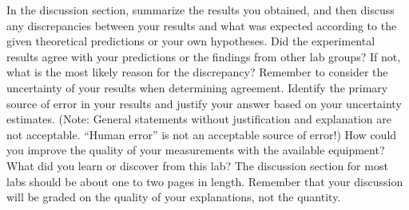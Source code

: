 \documentclass[12pt, letterpaper]{article}
\begin{document}
In the discussion section, summarize the results you obtained, and then discuss any discrepancies between your 
results and what was expected according to the given theoretical predictions or your own hypotheses. Did the 
experimental results agree with your predictions or the findings from other lab groups? If not, what is the most likely 
reason for the discrepancy? Remember to consider the uncertainty of your results when determining agreement. 
Identify the primary source of error in your results and justify your answer based on your uncertainty estimates. 
(Note: General statements without justification and explanation are not acceptable. “Human error” is not an 
acceptable source of error!) How could you improve the quality of your measurements with the available equipment? 
What did you learn or discover from this lab? The discussion section for most labs should be about one to two 
pages in length. Remember that your discussion will be graded on the quality of your explanations, not the quantity. 



\end{document}
